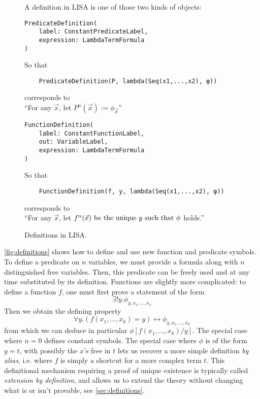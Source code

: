 \begin{figure}
  A definition in LISA is one of those two kinds of objects:
  \begin{lstlisting}[frame=single]
PredicateDefinition(
    label: ConstantPredicateLabel,
    expression: LambdaTermFormula
)
\end{lstlisting}
  So that 
  \begin{lstlisting}
    PredicateDefinition(P, lambda(Seq(x1,...,x2), φ)) 
  \end{lstlisting}
  corresponds to \\
    \hspace*{1.3em}``For any $\vec{x}$, let $P^n(\vec{x}) := \phi_{\vec{x}}$''


  \begin{lstlisting}[frame=single]
FunctionDefinition(
    label: ConstantFunctionLabel,
    out: VariableLabel, 
    expression: LambdaTermFormula
)
\end{lstlisting}
So that 
  \begin{lstlisting}
    FunctionDefinition(f, y, lambda(Seq(x1,...,x2), φ)) 
  \end{lstlisting}
  corresponds to \\
    \hspace*{1.3em}``For any $\vec{x}$, let $f^n(\vec{x}) \textnormal{ be the unique } y \textnormal{ such that } \phi$ holds.''

  \caption{Definitions in LISA.}
  \label{fig:definitions}
\end{figure}

\autoref{fig:definitions} shows how to define and use new function and predicate symbols. To define a predicate on $n$ variables, we must provide a formula along with $n$ distinguished free variables. Then, this predicate can be freely used and at any time substituted by its definition. Functions are slightly more complicated: to define a function $f$, one must first prove a statement of the form
$$\exists ! y. \phi_{y, x_1,...,x_k}$$
Then we obtain the defining property
$$\forall y. (f(x_1,...,x_k)=y) \leftrightarrow \phi_{y, x_1,...,x_k}$$
from which we can deduce in particular $\phi[f(x_1,...,x_k)/y]$.
The special case where $n=0$ defines constant symbols. The special case where $\phi$ is of the form $y=t$, with possibly the $x$'s free in $t$ lets us recover a more simple definition \textit{by alias}, i.e. where  $f$ is simply a shortcut for a more complex term $t$.
This definitional mechanism requiring a proof of unique existence is typically called \textit{extension by definition}, and allows us to extend the theory without changing what is or isn't provable, see \autoref{sec:definitions}.

